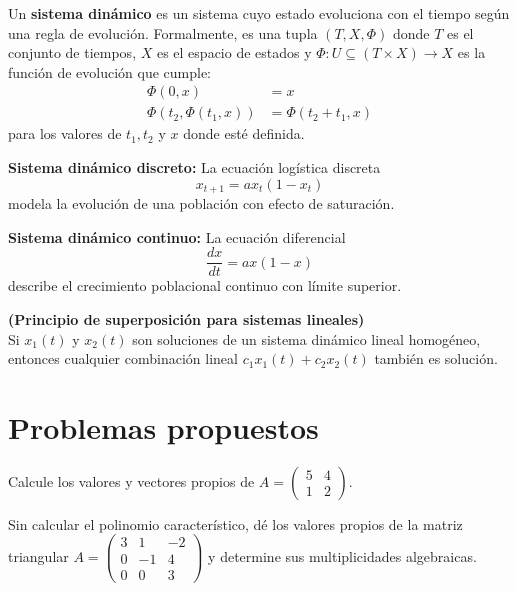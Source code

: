 \begin{definition}
Un \textbf{sistema dinámico} es un sistema cuyo estado evoluciona con el tiempo según una regla de evolución. Formalmente, es una tupla $(T, X, \Phi)$ donde $T$ es el conjunto de tiempos, $X$ es el espacio de estados y $\Phi: U \subseteq (T \times X) \to X$ es la función de evolución que cumple:
\begin{align*}
\Phi(0, x) &= x \\
\Phi(t_2, \Phi(t_1, x)) &= \Phi(t_2 + t_1, x)
\end{align*}
para los valores de $t_1, t_2$ y $x$ donde esté definida.
\end{definition}

\begin{example}
\textbf{Sistema dinámico discreto:} La ecuación logística discreta
\[
x_{t+1} = a x_t (1 - x_t)
\]
modela la evolución de una población con efecto de saturación.
\end{example}

\begin{example}
\textbf{Sistema dinámico continuo:} La ecuación diferencial
\[
\frac{dx}{dt} = a x (1 - x)
\]
describe el crecimiento poblacional continuo con límite superior.
\end{example}

\begin{theorem}
\textbf{(Principio de superposición para sistemas lineales)}\\
Si $x_1(t)$ y $x_2(t)$ son soluciones de un sistema dinámico lineal homogéneo, entonces cualquier combinación lineal $c_1 x_1(t) + c_2 x_2(t)$ también es solución.
\end{theorem}

\section{Problemas propuestos}

\begin{prob}
Calcule los valores y vectores propios de $A=\begin{pmatrix} 5 & 4 \\ 1 & 2 \end{pmatrix}$.
\end{prob}

\begin{prob}
Sin calcular el polinomio característico, dé los valores propios de la matriz triangular
$A=\begin{pmatrix} 3 & 1 & -2 \\ 0 & -1 & 4 \\ 0 & 0 & 3 \end{pmatrix}$
y determine sus multiplicidades algebraicas.
\end{prob}

